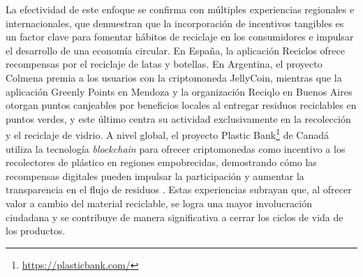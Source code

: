 La efectividad de este enfoque se confirma con múltiples experiencias regionales e internacionales, que demuestran que la incorporación de incentivos tangibles es un factor clave para fomentar hábitos de reciclaje en los consumidores e impulsar el desarrollo de una economía circular. En España, la aplicación Reciclos \cite{reciclos2024} ofrece recompensas por el reciclaje de latas y botellas. En Argentina, el proyecto Colmena \cite{colmena2024} premia a los usuarios con la \gls{criptomoneda} JellyCoin, mientras que la aplicación Greenly Points \cite{greenlypoints2024} en Mendoza y la organización Reciqlo en Buenos Aires \cite{innovar2024vidrio} otorgan puntos canjeables por beneficios locales al entregar residuos reciclables en puntos verdes, y este último centra su actividad exclusivamente en la recolección y el reciclaje de vidrio. A nivel global, el proyecto Plastic Bank\footnote{\url{https://plasticbank.com/}} de Canadá utiliza la tecnología \textit{blockchain} para ofrecer criptomonedas como incentivo a los recolectores de plástico en regiones empobrecidas, demostrando cómo las recompensas digitales pueden impulsar la participación y aumentar la transparencia en el flujo de residuos \cite{baralla2023waste}. Estas experiencias subrayan que, al ofrecer valor a cambio del material reciclable, se logra una mayor involucración ciudadana y se contribuye de manera significativa a cerrar los ciclos de vida de los productos.


